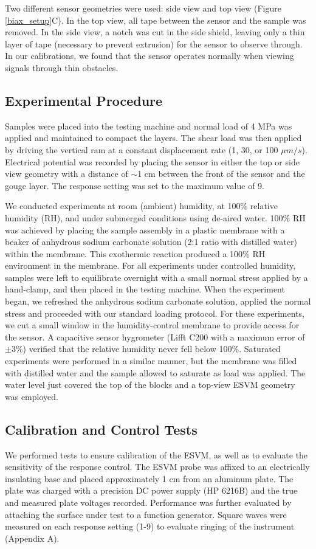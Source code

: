 Two different sensor geometries were used: side view and top view (Figure \ref{biax_setup}C).  In the top view, all tape between the sensor and the sample was removed.  In the side view, a notch was cut in the side shield, leaving only a thin layer of tape (necessary to prevent extrusion) for the sensor to observe through.  In our calibrations, we found that the sensor operates normally when viewing signals through thin obstacles.  

\subsection{Experimental Procedure}
Samples were placed into the testing machine and normal load of 4 MPa was applied and maintained to compact the layers.  The shear load was then applied by driving the vertical ram at a constant displacement rate (1, 30, or 100 $\mu m/s$).  Electrical potential was recorded by placing the sensor in either the top or side view geometry with a distance of $\sim$1 cm between the front of the sensor and the gouge layer.  The response setting was set to the maximum value of 9.  
	 
We conducted experiments at room (ambient) humidity, at 100\% relative humidity (RH), and under submerged conditions using de-aired water.  100\% RH was achieved by placing the sample assembly in a plastic membrane with a beaker of anhydrous sodium carbonate solution (2:1 ratio with distilled water) within the membrane.  This exothermic reaction produced a 100\% RH environment in the membrane.  For all experiments under controlled humidity, samples were left to equilibrate overnight with a small normal stress applied by a hand-clamp, and then placed in the testing machine. When the experiment began, we refreshed the anhydrous sodium carbonate solution, applied the normal stress and proceeded with our standard loading protocol.  For these experiments, we cut a small window in the humidity-control membrane to provide access for the sensor.  A capacitive sensor hygrometer (Lifft C200 with a maximum error of $\pm3\%$) verified that the relative humidity never fell below 100\%.  Saturated experiments were performed in a similar manner, but the membrane was filled with distilled water and the sample allowed to saturate as load was applied.  The water level just covered the top of the blocks and a top-view ESVM geometry was employed. 

\subsection{Calibration and Control Tests}
We performed tests to ensure calibration of the ESVM, as well as to evaluate the sensitivity of the response control.  The ESVM probe was affixed to an electrically insulating base and placed approximately 1 cm from an aluminum plate.  The plate was charged with a precision DC power supply (HP 6216B) and the true and measured plate voltages recorded. Performance was further evaluated by attaching the surface under test to a function generator.  Square waves were measured on each response setting (1-9) to evaluate ringing of the instrument (Appendix A).

